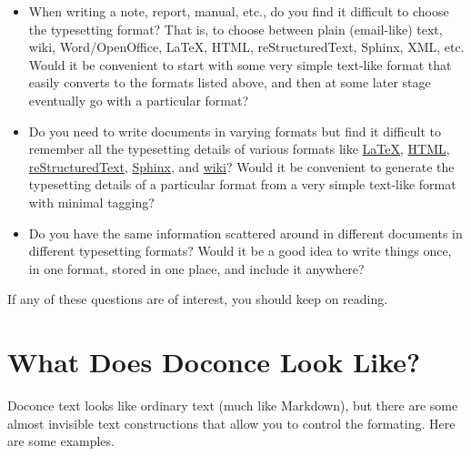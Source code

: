 \documentclass[%
oneside,                 %
final,                   %
10pt]{article}
\begin{document}
\begin{itemize}
 \item When writing a note, report, manual, etc., do you find it difficult
   to choose the typesetting format? That is, to choose between plain
   (email-like) text, wiki, Word/OpenOffice, {\LaTeX}, HTML,
   reStructuredText, Sphinx, XML, etc.  Would it be convenient to
   start with some very simple text-like format that easily converts
   to the formats listed above, and then at some later stage
   eventually go with a particular format?

 \item Do you need to write documents in varying formats but find it
   difficult to remember all the typesetting details of various
   formats like \href{{http://refcards.com/docs/silvermanj/amslatex/LaTeXRefCard.v2.0.pdf}}{LaTeX}, \href{{http://www.htmlcodetutorial.com/}}{HTML}, \href{{http://docutils.sourceforge.net/docs/ref/rst/restructuredtext.html}}{reStructuredText}, \href{{http://sphinx.pocoo.org/contents.html}}{Sphinx}, and \href{{http://code.google.com/p/support/wiki/WikiSyntax}}{wiki}? Would it be convenient
   to generate the typesetting details of a particular format from a
   very simple text-like format with minimal tagging?

 \item Do you have the same information scattered around in different
   documents in different typesetting formats? Would it be a good idea
   to write things once, in one format, stored in one place, and
   include it anywhere?
\end{itemize}

\noindent
If any of these questions are of interest, you should keep on reading.


\section{What Does Doconce Look Like?}

Doconce text looks like ordinary text (much like Markdown), but there
are some almost invisible text constructions that allow you to control
the formating. Here are some examples.
\end{document}
